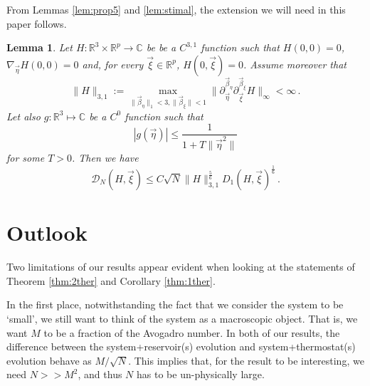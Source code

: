 \documentclass{article}
\renewcommand\v[1]{\vec{#1}}
\newcommand*\R{ \mathds{R} }
\newcommand\set[1]{\left\{ #1 \right\}}
\newtheorem{mylemma}[mythm]{Lemma}
\begin{document}
From Lemmas \ref{lem:prop5} and \ref{lem:stimal}, the extension we will need in this paper follows. 
 
 \begin{mylemma} \label{lem:prop5new} 
 Let $H: \mathds R^3\times \mathds R^p\to\mathds C$ be be a $C^{3,1}$ function such that  $H(0,0)=0$,
$\nabla_{\v\eta}H(0,0)=0$ and, for every $\v\xi\in\R^p$, $H(0,\v\xi)=0$. Assume moreover that
\begin{equation}\label{eq:H31}
\|H\|_{3,1}:=\max_{\|\v 
 \beta_\eta\|_1<3,\|\v\beta_\xi\|<1}\bigl\|\partial_{\v\eta}^{\v\beta_\eta}\partial_{\v\xi}^{\v\beta_\xi}
 H\bigr\|_\infty< \infty\, .
\end{equation}
Let also $g:\mathds R^3\mapsto\mathds C$ be a $C^0$ function such that 
\[
|g(\v\eta)|\leq \frac1{1+T\|\v\eta^2\|}
\]
for some $T>0$.
Then we have 
\begin{equation}\label{eq:estima2}
\mathcal D_N(H,\v\xi)\leq  C \sqrt{N}\|H\|_{3,1}^{\frac56}
D_1(H,\v\xi)^{\frac16}\, .
\end{equation}
%
 \end{mylemma}
 
%
 	 
\section{Outlook}\label{sec:out}

Two limitations of our results appear evident when looking at the statements of Theorem \ref{thm:2ther} and Corollary
\ref{thm:1ther}. 

In the first place, notwithstanding the fact that we consider the system to be `small', we still want to think of the
system as a macroscopic object. That is, we want $M$ to be a fraction of the Avogadro number. In both of our results,
the difference between the system+reservoir(s) evolution and system+thermostat(s) evolution behave as $M/\sqrt{N}$. This
implies that, for the result to be interesting, we need $N>>M^2$, and thus $N$ has to be un-physically large.
\end{document}
